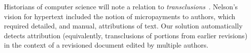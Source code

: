 Historians of computer science will note a relation
to \textit{transclusions}~\cite{Nelson81}.
Nelson's vision for hypertext included the notion
of micropayments to authors, which required detailed,
and manual, attributions of text.
Our solution automatically detects attribution
(equivalently, transclusions of portions from earlier revisions)
in the context of a revisioned document edited
by multiple authors.


